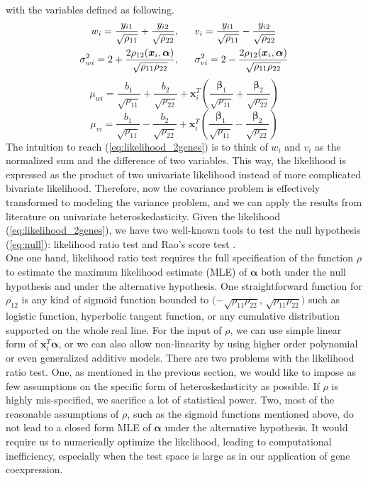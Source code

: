 \documentclass[aap, preprint]{imsart}
\numberwithin{equation}{section}
\theoremstyle{plain}
\begin{document}
with the variables defined as following.
\begin{align*}
w_i = \frac{y_{i1}}{\sqrt{\rho_{11}}} + \frac{y_{i2}}{\sqrt{\rho_{22}}}, 
\hspace{6mm} &
v_i = \frac{y_{i1}}{\sqrt{\rho_{11}}} - \frac{y_{i2}}{\sqrt{\rho_{22}}}\\
\sigma_{wi}^2 = 2 + \frac{2\rho_{12}(\bm{x}_i, \bm{\alpha})}{\sqrt{\rho_{11}\rho_{22}}}, \hspace{6mm}&
\sigma_{vi}^2 = 2 - \frac{2\rho_{12}(\bm{x}_i, \bm{\alpha})}{\sqrt{\rho_{11}\rho_{22}}}
\end{align*}
$$\mu_{wi} = \frac{{b}_1}{\sqrt{\rho_{11}}} + \frac{{b}_2}{\sqrt{\rho_{22}}} + \bm{x}_i^T \left(\frac{\bm{\beta}_1}{\sqrt{\rho_{11}}} + \frac{\bm{\beta}_2}{\sqrt{\rho_{22}}}\right)$$
$$\mu_{vi} = \frac{{b}_1}{\sqrt{\rho_{11}}} - \frac{{b}_2}{\sqrt{\rho_{22}}} + \bm{x}_i^T \left(\frac{\bm{\beta}_1}{\sqrt{\rho_{11}}} - \frac{\bm{\beta}_2}{\sqrt{\rho_{22}}}\right)$$
The intuition to reach (\ref{eq:likelihood_2genes}) is to think of $w_i$ and $v_i$ as the normalized sum and the difference of two variables. This way, the likelihood is expressed as the product of two univariate likelihood instead of more complicated bivariate likelihood. Therefore, now the covariance problem is effectively transformed to modeling the variance problem, and we can apply the results from literature on univariate heteroskedasticity. Given the likelihood (\ref{eq:likelihood_2genes}), we have two well-known tools to test the null hypothesis (\ref{eq:null}): likelihood ratio test and Rao's score test \cite{breusch1979simple}. \\

One one hand, likelihood ratio test requires the full specification of the function $\rho$ to estimate the maximum likelihood estimate (MLE) of $\bm{\alpha}$ both under the null hypothesis and under the alternative hypothesis. One straightforward function for $\rho_{12}$ is any kind of sigmoid function bounded to $(-\sqrt{\rho_{11}\rho_{22}}$, $\sqrt{\rho_{11}\rho_{22}})$ such as logistic function, hyperbolic tangent function, or any cumulative distribution supported on the whole real line. For the input of $\rho$, we can use simple linear form of $\bm{x}_i^T\bm{\alpha}$, or we can also allow non-linearity by using higher order polynomial or even generalized additive models. There are two problems with the likelihood ratio test. One, as mentioned in the previous section, we would like to impose as few assumptions on the specific form of heteroskedasticity as possible. If $\rho$ is highly mis-specified, we sacrifice a lot of statistical power. Two, most of the reasonable assumptions of $\rho$, such as the sigmoid functions mentioned above, do not lead to a closed form MLE of $\bm{\alpha}$ under the alternative hypothesis. It would require us to numerically optimize the likelihood, leading to computational inefficiency, especially when the test space is large as in our application of gene coexpression. \\
\end{document}
